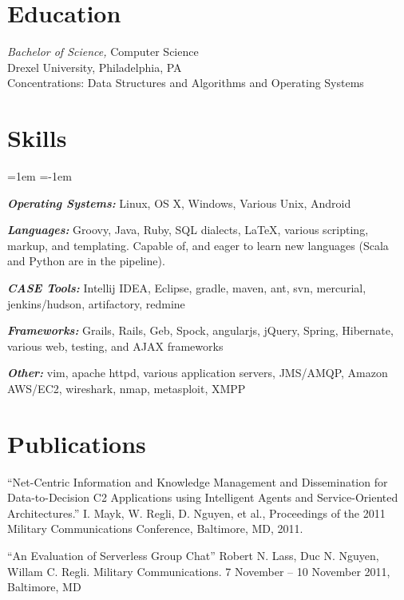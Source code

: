 \documentclass[margin]{res}
\begin{document}
\begin{resume}
\section{Education} {\sl Bachelor of Science,} Computer Science \\
   Drexel University, Philadelphia, PA \\
   Concentrations: Data Structures and Algorithms and Operating Systems


\section{Skills}
\begin{list}{}%
{\leftmargin=1em \itemindent=-1em}
  \item \textbf{\textit{Operating Systems:}} Linux, OS X, Windows, Various Unix, Android
  \item \textbf{\textit{Languages:}} Groovy, Java, Ruby, SQL dialects, \LaTeX, various scripting, markup, and templating. Capable of, and eager to learn new languages (Scala and Python are in the pipeline).
  \item \textbf{\textit{CASE Tools: }}  Intellij IDEA, Eclipse, gradle, maven, ant, svn, mercurial, jenkins/hudson, artifactory, redmine
  \item \textbf{\textit{Frameworks: }}  Grails, Rails, Geb, Spock, angularjs, jQuery, Spring, Hibernate, various web, testing, and AJAX frameworks
  \item \textbf{\textit{Other: }} vim, apache httpd, various application servers, JMS/AMQP, Amazon AWS/EC2, wireshark, nmap, metasploit, XMPP
\end{list}


\section{Publications}
  ``Net-Centric Information and Knowledge Management and Dissemination for Data-to-Decision C2 Applications using Intelligent Agents and Service-Oriented Architectures.'' I. Mayk, W. Regli, D. Nguyen, et al.,  Proceedings of the 2011 Military Communications Conference, Baltimore, MD, 2011. 

  ``An Evaluation of Serverless Group Chat'' Robert N. Lass, Duc N. Nguyen,  Willam C. Regli. Military Communications. 7 November -- 10 November 2011, Baltimore, MD


\end{resume}
\end{document}
